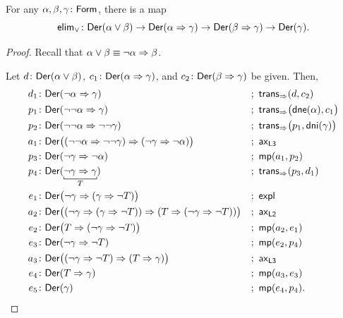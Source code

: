 \begin{lem}
    \label{lem:elim-or}
    For any\/ $\alpha,\beta,\gamma\colon\fun{Form}$, there is a map
    \[
        \fun{elim}_\lor\colon
            \fun{Der}(\alpha\lor\beta)
            \to
            \fun{Der}(\alpha\imp\gamma)
            \to
            \fun{Der}(\beta\imp\gamma)
            \to
            \fun{Der}(\gamma).
    \]
\end{lem}

\begin{proof}
    Recall that $\alpha\lor\beta\equiv\neg\alpha\mathrel{\Rightarrow}\beta$.

    Let $d\colon\fun{Der}(\alpha\lor\beta)$, $c_1\colon\fun{Der}(\alpha\imp\gamma)$, and $c_2\colon\fun{Der}(\beta\imp\gamma)$ be given. Then,
    {\small
    \begin{align*}
        d_1&\colon\fun{Der}(\neg\alpha\imp\gamma)
            &&;\ \fun{trans}_{\imp}(d,c_2)\\
        p_1&\colon\fun{Der}(\neg\neg\alpha\imp\gamma)
            &&;\ \fun{trans}_{\imp}\bigl(\fun{dne}(\alpha),c_1\bigr)\\
        p_2&\colon\fun{Der}(\neg\neg\alpha\imp\neg\neg\gamma)
            &&;\ \fun{trans}_{\imp}\bigl(p_1,\fun{dni}(\gamma)\bigr)\\
        a_1&\colon\fun{Der}\bigl(
            (\neg\neg\alpha\imp\neg\neg\gamma)
            \imp
            (\neg\gamma\imp\neg\alpha)
        \bigr)
            &&;\ \fun{ax}_{\fun{L3}}\\
        p_3&\colon\fun{Der}(\neg\gamma\imp\neg\alpha)
            &&;\ \fun{mp}(a_1,p_2)\\
        p_4&\colon\fun{Der}(
            \explain[T]{\neg\gamma\imp\gamma}
        )
            &&;\ \fun{trans}_{\imp}(p_3,d_1)\\
        e_1&\colon\fun{Der}\bigl(
            \neg\gamma\imp(\gamma\imp\neg T)
        \bigr)
            &&;\ \fun{expl}\\
        a_2&\colon\fun{Der}\bigl(
            (\neg\gamma\imp(\gamma\imp\neg T))
            \imp
            (T\imp(\neg\gamma\imp\neg T))
        \bigr)
            &&;\ \fun{ax}_{\fun{L2}}\\
        e_2&\colon\fun{Der}\bigl(
            T\imp(\neg\gamma\imp\neg T)
        \bigr)
            &&;\ \fun{mp}(a_2,e_1)\\
        e_3&\colon\fun{Der}(\neg\gamma\imp\neg T)
            &&;\ \fun{mp}(e_2,p_4)\\
        a_3&\colon\fun{Der}\bigl(
            (\neg\gamma\imp\neg T)
            \imp
            (T\imp\gamma)\bigr)
            &&;\ \fun{ax}_{\fun{L3}}\\
        e_4&\colon\fun{Der}(T\imp\gamma)
            &&;\ \fun{mp}(a_3,e_3)\\
        e_5&\colon\fun{Der}(\gamma)
            &&;\ \fun{mp}(e_4,p_4).
    \end{align*}}
\end{proof}

